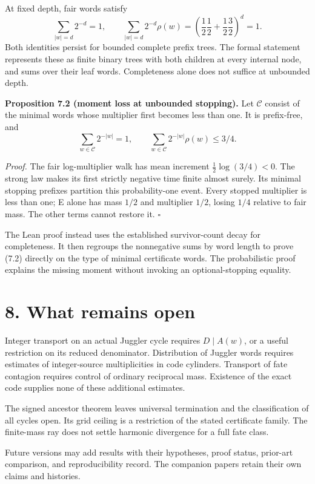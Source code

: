 \documentclass[11pt,a4paper]{article}
\begin{document}
At fixed depth, fair words satisfy \[
\sum_{|w|=d}2^{-d}=1,\qquad
\sum_{|w|=d}2^{-d}\rho(w)
=\left(\frac12\frac12+\frac12\frac32\right)^d=1.
\tag{7.1}
\] Both identities persist for bounded complete prefix trees. The formal
statement represents these as finite binary trees with both children at
every internal node, and sums over their leaf words. Completeness alone
does not suffice at unbounded depth.

\textbf{Proposition 7.2 (moment loss at unbounded stopping).} Let
\(\mathcal C\) consist of the minimal words whose multiplier first
becomes less than one. It is prefix-free, and \[
\sum_{w\in\mathcal C}2^{-|w|}=1,\qquad
\sum_{w\in\mathcal C}2^{-|w|}\rho(w)\le3/4.
\tag{7.2}
\]

\emph{Proof.} The fair log-multiplier walk has mean increment
\(\frac12\log(3/4)<0\). The strong law makes its first strictly negative
time finite almost surely. Its minimal stopping prefixes partition this
probability-one event. Every stopped multiplier is less than one; E
alone has mass \(1/2\) and multiplier \(1/2\), losing \(1/4\) relative
to fair mass. The other terms cannot restore it. \(\square\)

The Lean proof instead uses the established survivor-count decay for
completeness. It then regroups the nonnegative sums by word length to
prove (7.2) directly on the type of minimal certificate words. The
probabilistic proof explains the missing moment without invoking an
optional-stopping equality.

\section{8. What remains open}\label{what-remains-open}

Integer transport on an actual Juggler cycle requires \(D\mid A(w)\), or
a useful restriction on its reduced denominator. Distribution of Juggler
words requires estimates of integer-source multiplicities in code
cylinders. Transport of fate contagion requires control of ordinary
reciprocal mass. Existence of the exact code supplies none of these
additional estimates.

The signed ancestor theorem leaves universal termination and the
classification of all cycles open. Its grid ceiling is a restriction of
the stated certificate family. The finite-mass ray does not settle
harmonic divergence for a full fate class.

Future versions may add results with their hypotheses, proof status,
prior-art comparison, and reproducibility record. The companion papers
retain their own claims and histories.
\end{document}
